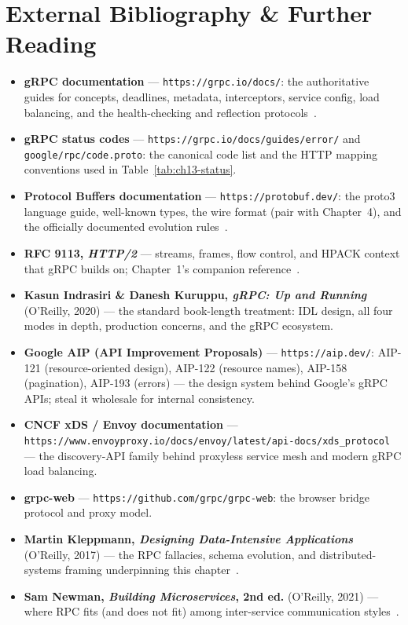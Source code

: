 \section{External Bibliography \& Further Reading}
\label{sec:ch13-biblio}

\begin{itemize}
  \item \textbf{gRPC documentation} --- \texttt{https://grpc.io/docs/}: the
        authoritative guides for concepts, deadlines, metadata, interceptors,
        service config, load balancing, and the health-checking and reflection
        protocols~\cite{grpcdocs}.
  \item \textbf{gRPC status codes} --- \texttt{https://grpc.io/docs/guides/error/}
        and \texttt{google/rpc/code.proto}: the canonical code list and the
        HTTP mapping conventions used in Table~\ref{tab:ch13-status}.
  \item \textbf{Protocol Buffers documentation} ---
        \texttt{https://protobuf.dev/}: the proto3 language guide, well-known
        types, the wire format (pair with Chapter~4), and the officially
        documented evolution rules~\cite{protobufdocs}.
  \item \textbf{RFC 9113, \emph{HTTP/2}} --- streams, frames, flow control, and
        HPACK context that gRPC builds on; Chapter~1's companion
        reference~\cite{rfc9113}.
  \item \textbf{Kasun Indrasiri \& Danesh Kuruppu, \emph{gRPC: Up and Running}}
        (O'Reilly, 2020) --- the standard book-length treatment: IDL design,
        all four modes in depth, production concerns, and the gRPC ecosystem.
  \item \textbf{Google AIP (API Improvement Proposals)} ---
        \texttt{https://aip.dev/}: AIP-121 (resource-oriented design), AIP-122
        (resource names), AIP-158 (pagination), AIP-193 (errors) --- the design
        system behind Google's gRPC APIs; steal it wholesale for internal
        consistency.
  \item \textbf{CNCF xDS / Envoy documentation} ---
        \texttt{https://www.envoyproxy.io/docs/envoy/latest/api-docs/xds\_protocol}
        --- the discovery-API family behind proxyless service mesh and modern
        gRPC load balancing.
  \item \textbf{grpc-web} --- \texttt{https://github.com/grpc/grpc-web}: the
        browser bridge protocol and proxy model.
  \item \textbf{Martin Kleppmann, \emph{Designing Data-Intensive Applications}}
        (O'Reilly, 2017) --- the RPC fallacies, schema evolution, and
        distributed-systems framing underpinning this
        chapter~\cite{kleppmann2017ddia}.
  \item \textbf{Sam Newman, \emph{Building Microservices}, 2nd ed.}
        (O'Reilly, 2021) --- where RPC fits (and does not fit) among
        inter-service communication styles~\cite{newman2021microservices}.
\end{itemize}
